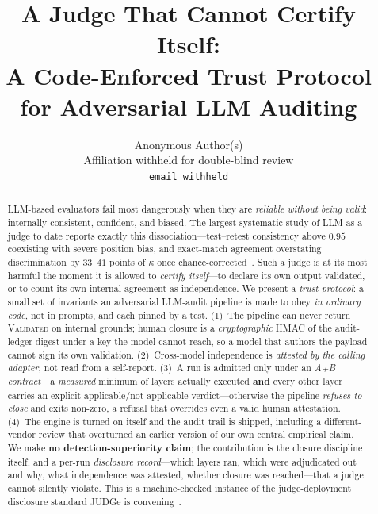 \documentclass{article}
\title{A Judge That Cannot Certify Itself:\\ A Code-Enforced Trust Protocol for Adversarial LLM Auditing}
\author{%
  Anonymous Author(s)\\
  Affiliation withheld for double-blind review\\
  \texttt{email withheld}%
}
\begin{document}
\maketitle

\begin{abstract}
LLM-based evaluators fail most dangerously when they are \emph{reliable without being valid}:
internally consistent, confident, and biased. The largest systematic study of LLM-as-a-judge to date
reports exactly this dissociation---test--retest consistency above $0.95$ coexisting with severe
position bias, and exact-match agreement overstating discrimination by $33$--$41$ points of $\kappa$
once chance-corrected~\cite{norman2026reliability}. Such a judge is at its most harmful the moment it is
allowed to \emph{certify itself}---to declare its own output validated, or to count its own internal
agreement as independence. We present a \emph{trust protocol}: a small set of invariants an adversarial
LLM-audit pipeline is made to obey \emph{in ordinary code}, not in prompts, and each pinned by a test.
(1)~The pipeline can never return \textsc{Validated} on internal grounds; human closure is a
\emph{cryptographic} HMAC of the audit-ledger digest under a key the model cannot reach, so a model that
authors the payload cannot sign its own validation. (2)~Cross-model independence is \emph{attested by the
calling adapter}, not read from a self-report. (3)~A run is admitted only under an \emph{A+B contract}---a
\emph{measured} minimum of layers actually executed \textbf{and} every other layer carries an explicit
applicable/not-applicable verdict---otherwise the pipeline \emph{refuses to close} and exits non-zero, a
refusal that overrides even a valid human attestation. (4)~The engine is turned on itself and the audit
trail is shipped, including a different-vendor review that overturned an earlier version of our own
central empirical claim. We make \textbf{no detection-superiority claim}; the contribution is the closure
discipline itself, and a per-run \emph{disclosure record}---which layers ran, which were adjudicated out
and why, what independence was attested, whether closure was reached---that a judge cannot silently
violate. This is a machine-checked instance of the judge-deployment disclosure standard JUDGe is
convening~\cite{judge2026}.
\end{abstract}
\end{document}
